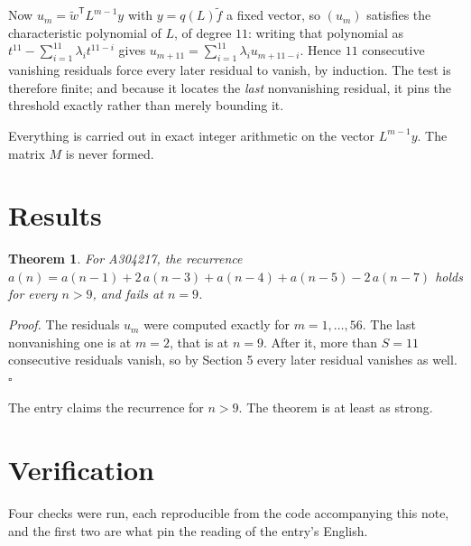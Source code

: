 \documentclass[11pt]{article}
\newtheorem{theorem}{Theorem}
\theoremstyle{definition}
\begin{document}
Now $u_m = \tilde w^{\mathsf T} L^{m-1} y$ with $y = q(L)\tilde f$ a fixed vector, so $(u_m)$ satisfies the characteristic polynomial of $L$, of degree $11$: writing that polynomial as $t^{11} - \sum_{i=1}^{11} \lambda_i t^{11-i}$ gives $u_{m+11} = \sum_{i=1}^{11} \lambda_i u_{m+11-i}$. Hence $11$ consecutive vanishing residuals force every later residual to vanish, by induction. The test is therefore finite; and because it locates the {\itshape last} nonvanishing residual, it pins the threshold exactly rather than merely bounding it.

Everything is carried out in exact integer arithmetic on the vector $L^{m-1}y$. The matrix $M$ is never formed.

\section{Results}

\begin{theorem} For A304217, the recurrence $a(n) = a(n-1) + 2\,a(n-3) + a(n-4) + a(n-5) - 2\,a(n-7)$ holds for every $n > 9$, and fails at $n = 9$.\end{theorem}

{\itshape Proof.} The residuals $u_m$ were computed exactly for $m = 1,\dots,56$. The last nonvanishing one is at $m = 2$, that is at $n = 9$. After it, more than $S = 11$ consecutive residuals vanish, so by Section 5 every later residual vanishes as well. $\square$

The entry claims the recurrence for $n > 9$. The theorem is at least as strong.

\section{Verification}

Four checks were run, each reproducible from the code accompanying this note, and the first two are what pin the reading of the entry's English.
\end{document}
